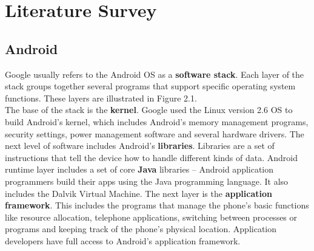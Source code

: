 \chapter{Literature Survey}
\section{Android}
\hspace*{0.82cm}Google usually refers to the Android OS as a \textbf{software stack}. Each layer of 
the stack groups together several programs that support specific operating system functions. These
layers are illustrated in Figure 2.1.\\[0.5cm]
\hspace*{0.82cm}The base of the stack is the \textbf{kernel}. Google used the Linux version 2.6 OS to build
Android's kernel, which includes Android's memory management programs, security settings,
power management software and several hardware drivers. The next level of software
includes Android's \textbf{libraries}. Libraries are a set of instructions that tell the device how to
handle different kinds of data. Android runtime layer includes a set of core \textbf{Java} libraries --
Android application programmers build their apps using the Java programming language. It
also includes the Dalvik Virtual Machine. The next layer is the \textbf{application framework}. This
includes the programs that manage the phone's basic functions like resource allocation,
telephone applications, switching between processes or programs and keeping track of the
phone's physical location. Application developers have full access to Android's application
framework.
